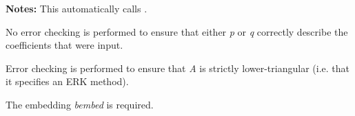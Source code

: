 \documentclass[letterpaper,10pt,english]{sphinxmanual}
\begin{document}
\begin{fulllineitems}
\begin{description}
\begin{itemize}
\end{itemize}

\end{description}

\textbf{Notes:} This automatically calls {\hyperref[c_interface/User_callable:ARKodeSetExplicit]{}}.

No error checking is performed to ensure that either \emph{p} or \emph{q}
correctly describe the coefficients that were input.

Error checking is performed to ensure that \emph{A} is strictly
lower-triangular (i.e. that it specifies an ERK method).

The embedding \emph{bembed} is required.

\end{fulllineitems}

\end{document}

